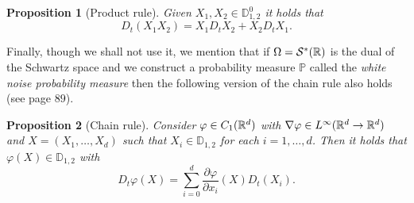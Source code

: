 \documentclass[12pt]{article}
\newtheorem{proposition}{Proposition}
\begin{document}
\begin{proposition}[Product rule]
	Given $X_1,X_2\in \mathbb{D}^0_{1,2}$ it holds that
	\begin{equation*}
		D_t(X_1X_2)=X_1D_tX_2+X_2D_tX_1.
	\end{equation*}

\end{proposition}
Finally, though we shall not use it, we mention that if $\Omega=\mathcal{S}^*({\mathbb R})$ is the dual of the Schwartz space and we construct a probability measure $\mathbb{P}$ called the \emph{white noise probability measure}  then the following version of the chain rule also holds (see \cite{nunno2008malliavin} page $89$).
\begin{proposition}[Chain rule]
	Consider $\varphi\in C_1({\mathbb R}^d)$ with $\nabla \varphi\in {L^\infty({\mathbb R}^d\to{\mathbb R}^d)}$ and $X=(X_1,\ldots,X_d)$ such that $X_i\in \mathbb{D}_{1,2}$ for each $i=1,\ldots,d$. Then it holds that $\varphi(X)\in \mathbb{D}_{1,2}$ with
	\begin{equation*}
		D_t\varphi(X)=\sum_{i=0}^{d} \frac{\partial \varphi}{\partial x_i}(X)D_t(X_i) .
	\end{equation*}

\end{proposition}
\end{document}
